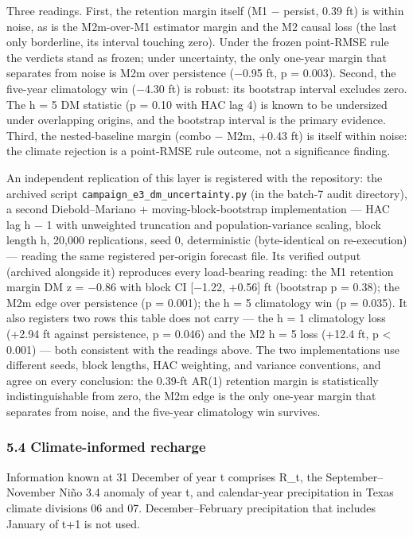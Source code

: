 \documentclass[11pt]{article}
\begin{document}
Three readings. First, the retention margin itself (M1 \ensuremath{-} persist, 0.39
ft) is within noise, as is the M2m-over-M1 estimator margin and the M2
causal loss (the last only borderline, its interval touching zero).
Under the frozen point-RMSE rule the verdicts stand as frozen; under
uncertainty, the only one-year margin that separates from noise is M2m
over persistence (\ensuremath{-}0.95 ft, p = 0.003). Second, the five-year
climatology win (\ensuremath{-}4.30 ft) is robust: its bootstrap interval excludes
zero. The h = 5 DM statistic (p = 0.10 with HAC lag 4) is known to be
undersized under overlapping origins, and the bootstrap interval is the
primary evidence. Third, the nested-baseline margin (combo \ensuremath{-} M2m, +0.43
ft) is itself within noise: the climate rejection is a point-RMSE rule
outcome, not a significance finding.

An independent replication of this layer is registered with the
repository: the archived script
\texttt{campaign\_e3\_dm\_uncertainty.py} (in the batch-7 audit
directory), a second Diebold--Mariano + moving-block-bootstrap
implementation --- HAC lag h \ensuremath{-} 1 with unweighted truncation and
population-variance scaling, block length h, 20,000 replications, seed
0, deterministic (byte-identical on re-execution) --- reading the same
registered per-origin forecast file. Its verified output (archived
alongside it) reproduces every load-bearing reading: the M1 retention
margin DM z = \ensuremath{-}0.86 with block CI {[}\ensuremath{-}1.22, +0.56{]} ft (bootstrap p =
0.38); the M2m edge over persistence (p = 0.001); the h = 5 climatology
win (p = 0.035). It also registers two rows this table does not carry
--- the h = 1 climatology loss (+2.94 ft against persistence, p = 0.046)
and the M2 h = 5 loss (+12.4 ft, p \textless{} 0.001) --- both
consistent with the readings above. The two implementations use
different seeds, block lengths, HAC weighting, and variance conventions,
and agree on every conclusion: the 0.39-ft AR(1) retention margin is
statistically indistinguishable from zero, the M2m edge is the only
one-year margin that separates from noise, and the five-year climatology
win survives.

\subsubsection{5.4 Climate-informed
recharge}\label{edw-climate-informed-recharge}

Information known at 31 December of year t comprises R\_t, the
September--November Ni\~no 3.4 anomaly of year t, and calendar-year
precipitation in Texas climate divisions 06 and 07. December--February
precipitation that includes January of t+1 is not used.
\end{document}
